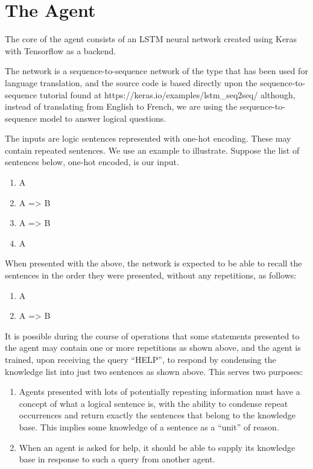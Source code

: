 \documentclass{article}
\begin{document}
\section{The Agent}
\label{the_agent}
The core of the agent consists of an LSTM neural network created
using Keras \cite{chollet2015keras}
with Tensorflow \cite{tensorflow2015-whitepaper}
as a backend.

The network is a sequence-to-sequence network of the type that has been used for language translation, and the source code is based directly upon the sequence-to-sequence tutorial found at https://keras.io/examples/lstm_seq2seq/ although, instead of translating from English to French, we are using the sequence-to-sequence model to answer logical questions.

The inputs are logic sentences represented with one-hot encoding. These may contain repeated sentences. We use an example to illustrate. Suppose the list of sentences below, one-hot encoded, is our input.

\begin{enumerate}
	\item A
	\item A => B
	\item A => B
	\item A
\end{enumerate}

When presented with the above, the network is expected to be able to recall the sentences in the order they were presented, without any repetitions, as follows:

\begin{enumerate}
	\item A
	\item A => B
\end{enumerate}

It is possible during the course of operations that some statements presented to the agent may contain one or more repetitions as shown above, and the agent is trained, upon receiving the query “HELP”, to respond by condensing the knowledge list into just two sentences as shown above. This serves two purposes:

\begin{enumerate}
	\item Agents presented with lots of potentially repeating information must have a concept of what a logical sentence is, with the ability to condense repeat occurrences and return exactly the sentences that belong to the knowledge base. This implies some knowledge of a sentence as a “unit” of reason.
	\item When an agent is asked for help, it should be able to supply its knowledge base in response to such a query from another agent.
\end{enumerate}
\end{document}

